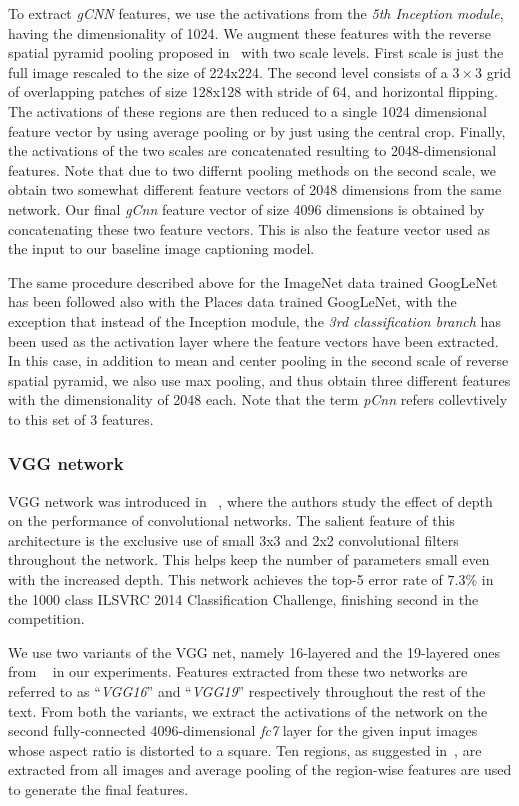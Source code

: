 To extract \emph{gCNN} features, we use the activations from the
\emph{5th Inception module}, having the dimensionality of 1024.
We augment these features with the reverse spatial pyramid pooling proposed
in~\cite{Gong2014} with two scale levels.
First scale is just the full image rescaled to the size of 224x224.
The second level consists of a $3\times3$ grid of overlapping patches of size
128x128 with stride of 64, and horizontal flipping.
The activations of these regions are then reduced to a single 1024 dimensional
feature vector by using average pooling or by just using the central crop.
Finally, the activations of the two scales are concatenated resulting to
2048-dimensional features.
Note that due to two differnt pooling methods on the second scale, we obtain
two somewhat different feature vectors of 2048 dimensions from the same network.
Our final \emph{gCnn} feature vector of size 4096 dimensions is obtained by
concatenating these two feature vectors.
This is also the feature vector used as the input to our baseline image
captioning model. 

The same procedure described above for the ImageNet data trained GoogLeNet has
been followed also with the Places data trained GoogLeNet, with the exception
that instead of the Inception module, the \emph{3rd classification branch} has
been used as the activation layer where the feature vectors have been extracted.
In this case, in addition to mean and center pooling in the second scale of
reverse spatial pyramid, we also use max pooling, and thus obtain three
different features with the dimensionality of 2048 each.
Note that the term \emph{pCnn} refers collevtively to this set of 3 features.

\subsubsection{VGG network} 
VGG network was introduced in ~\cite{Simonyan14c}, where the authors study the
effect of depth on the performance of convolutional networks.
The salient feature of this architecture is the exclusive use of small 3x3 and
2x2 convolutional filters throughout the network.
This helps keep the number of parameters small even with the increased depth.
This network achieves the top-5 error rate of $7.3\%$ in the 1000 class ILSVRC
2014 Classification Challenge, finishing second in the competition.

We use two variants of the VGG net, namely 16-layered and the 19-layered ones
from ~\cite{Simonyan14c} in our experiments.
Features extracted from these two networks are referred to as ``\emph{VGG16}''
and ``\emph{VGG19}'' respectively throughout the rest of the text.
From both the variants, we extract the activations of the network on the second
fully-connected 4096-dimensional \emph{fc7} layer for the given input images
whose aspect ratio is distorted to a square.
Ten regions, as suggested in~\cite{Krizhevsky2012}, are extracted from all
images and average pooling of the region-wise features are used to generate the
final features.

